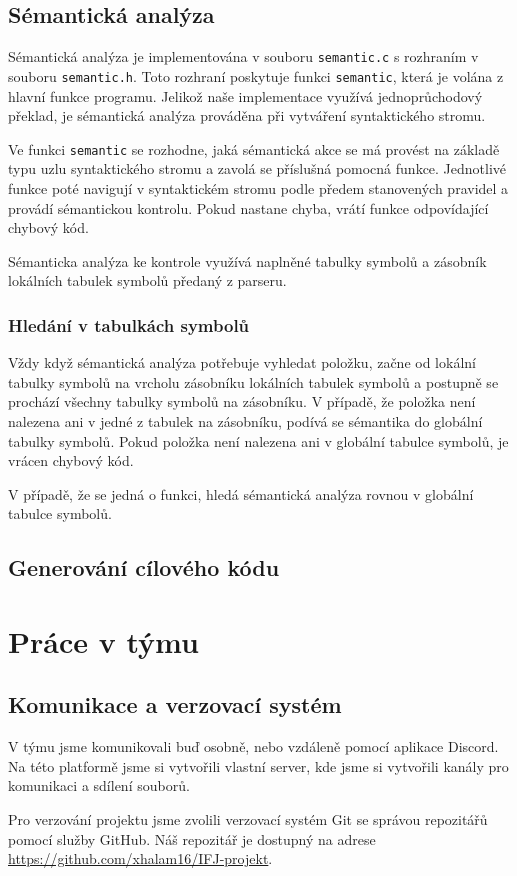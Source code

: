 \documentclass[a4paper, 11pt]{article}
\begin{document}
	\subsection{Sémantická analýza}
	Sémantická analýza je implementována v souboru \texttt{semantic.c} s rozhraním v souboru \texttt{semantic.h}. Toto rozhraní poskytuje funkci \texttt{semantic}, která je volána z hlavní funkce programu. Jelikož naše implementace využívá jednoprůchodový překlad, je sémantická analýza prováděna při vytváření syntaktického stromu.
	\par\noindent Ve funkci \texttt{semantic} se rozhodne, jaká sémantická akce se má provést na základě typu uzlu syntaktického stromu a zavolá se příslušná pomocná funkce. Jednotlivé funkce poté navigují v syntaktickém stromu podle předem stanovených pravidel a provádí sémantickou kontrolu. Pokud nastane chyba, vrátí funkce odpovídající chybový kód.
	\par\noindent Sémanticka analýza ke kontrole využívá naplněné tabulky symbolů a zásobník lokálních tabulek symbolů předaný z parseru.
	\subsubsection{Hledání v tabulkách symbolů}
	Vždy když sémantická analýza potřebuje vyhledat položku, začne od lokální tabulky symbolů na vrcholu zásobníku lokálních tabulek symbolů a postupně se prochází všechny tabulky symbolů na zásobníku. V případě, že položka není nalezena ani v jedné z tabulek na zásobníku, podívá se sémantika do globální tabulky symbolů.
	Pokud položka není nalezena ani v globální tabulce symbolů, je vrácen chybový kód.
	\par\noindent V případě, že se jedná o funkci, hledá sémantická analýza rovnou v globální tabulce symbolů. 

	\subsection{Generování cílového kódu}
	\label{sec:gen}

	\newpage
	\section{Práce v týmu}

	\subsection{Komunikace a verzovací systém}
	V týmu jsme komunikovali buď osobně, nebo vzdáleně pomocí aplikace Discord. Na této platformě jsme si vytvořili vlastní server, kde jsme si vytvořili kanály pro komunikaci a sdílení souborů. 
	\par\noindent Pro verzování projektu jsme zvolili verzovací systém Git se správou repozitářů pomocí služby GitHub. Náš repozitář je dostupný na adrese \url{https://github.com/xhalam16/IFJ-projekt}.
\end{document}

